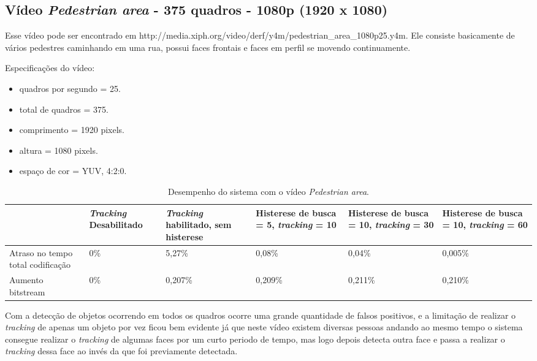 \documentclass[12pt]{article}
\begin{document}
\subsection{ Vídeo \textit{Pedestrian area} - 375 quadros - 1080p (1920 x 1080) }

Esse vídeo pode ser encontrado em http://media.xiph.org/video/derf/y4m/pedestrian\_area\_1080p25.y4m. Ele consiste basicamente de vários pedestres caminhando em uma rua, possui faces frontais e faces em perfil se movendo continuamente. 

Especificações do vídeo:

\begin{itemize}
        \item quadros por segundo = 25.
        \item total de quadros    = 375.
        \item comprimento         = 1920 pixels.
        \item altura              = 1080 pixels.
        \item espaço de cor       = YUV, 4:2:0.
\end{itemize}


\begin{table}[H]
\begin{center}
\begin{tabular}{|p{2.3cm}|p{2.3cm}|p{2.3cm}|p{2.3cm}|p{2.3cm}|p{2.3cm}|}
\hline
\textbf{} & \textbf{\textit{Tracking} Desabilitado} & \textbf{\textit{Tracking} habilitado, sem histerese} & \textbf{Histerese de busca = 5, \textit{tracking} = 10} & \textbf{Histerese de busca = 10, \textit{tracking} = 30} & \textbf{Histerese de busca = 10, \textit{tracking} = 60} \\
\hline
Atraso no tempo total codificação & 0\% & 5,27\% & 0,08\% & 0,04\% & 0,005\% \\
\hline
Aumento bitstream  & 0\% & 0,207\% & 0,209\% & 0,211\% & 0,210\% \\
\hline
\end{tabular}
\caption{Desempenho do sistema com o vídeo \textit{Pedestrian area}.}
\label{tab:space_overhead}
\end{center}
\end{table}

Com a detecção de objetos ocorrendo em todos os quadros ocorre uma grande quantidade de falsos positivos, e a limitação de realizar o \textit{tracking} de apenas um objeto por vez ficou bem evidente já que neste vídeo existem diversas pessoas andando ao mesmo tempo o sistema consegue realizar o \textit{tracking} de algumas faces por um curto periodo de tempo, mas logo depois detecta outra face e passa a realizar o \textit{tracking} dessa face ao invés da que foi previamente detectada. 
\end{document}
